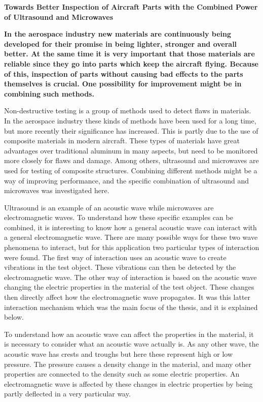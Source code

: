 \documentclass[11pt]{article}
\begin{document}
	
	\begingroup
		\centering
		\LARGE \textbf{Towards Better Inspection of Aircraft Parts with the Combined Power of Ultrasound and Microwaves} \par
		\vspace{1.0cm}
	\endgroup
	
	\noindent
	\textbf{
		In the aerospace industry new materials are continuously being developed for their promise in being lighter, stronger and overall better. At the same time it is very important that those materials are reliable since they go into parts which keep the aircraft flying. Because of this, inspection of parts without causing bad effects to the parts themselves is crucial. One possibility for improvement might be in combining such methods.
	}
	\begin{multicols}{2}		
		\noindent
		Non-destructive testing is a group of methods used to detect flaws in materials. In the aerospace industry these kinds of methods have been used for a long time, but more recently their significance has increased. This is partly due to the use of composite materials in modern aircraft. These types of materials have great advantages over traditional aluminum in many aspects, but need to be monitored more closely for flaws and damage. Among others, ultrasound and microwaves are used for testing of composite structures. Combining different methods might be a way of improving performance, and the specific combination of ultrasound and microwaves was investigated here.
		
		Ultrasound is an example of an acoustic wave while microwaves are electromagnetic waves. To understand how these specific examples can be combined, it is interesting to know how a general acoustic wave can interact with a general electromagnetic wave. There are many possible ways for these two wave phenomena to interact, but for this application two particular types of interaction were found. The first way of interaction uses an acoustic wave to create vibrations in the test object. These vibrations can then be detected by the electromagnetic wave. The other way of interaction is based on the acoustic wave changing the electric properties in the material of the test object. These changes then directly affect how the electromagnetic wave propagates. It was this latter interaction mechanism which was the main focus of the thesis, and it is explained below.
		
		To understand how an acoustic wave can affect the properties in the material, it is necessary to consider what an acoustic wave actually is. As any other wave, the acoustic wave has crests and troughs but here these represent high or low pressure. The pressure causes a density change in the material, and many other properties are connected to the density such as some electric properties. An electromagnetic wave is affected by these changes in electric properties by being partly deflected in a very particular way.
		

\end{multicols}
\end{document}
